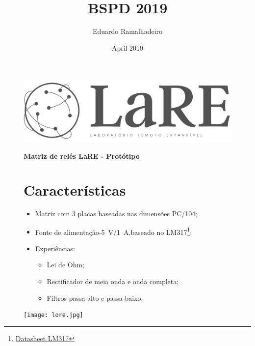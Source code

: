 \documentclass[a4paper,12pt,oneside,pdflatex,final,twocolumn]{article}
\title{BSPD 2019}
\author{Eduardo Ramalhadeiro}
\date{April 2019}
\begin{document}
\pagestyle{fancy}

\chead {\today}

\onecolumn

\begin{figure}
\begin{minipage}{0.47\textwidth}
\centering
\includegraphics[width=.7\textwidth,left,]{logo.jpg}

\end{minipage}
\hfill
\begin{minipage}{0.47\textwidth}
\raggedleft
\Huge \textbf{Matriz de relés LaRE - Protótipo}
\end{minipage}
\end{figure}


\begin{figure}
\begin{minipage}{0.47\textwidth}

\section{Características}
\begin{itemize}
    \item Matriz com 3 placas baseadas nas dimensões PC/104;
    \item Fonte de alimentação-\SI{5}{\volt}/\SI{1}{\ampere},\newline baseado no LM317\footnote{\href{https://www.ti.com/lit/ds/symlink/lm317.pdf}{Datasheet LM317}};
    \item Experiências:
    \begin{itemize}
        \item Lei de Ohm;
        \item Rectificador de meia onda e onda completa;
        \item Filtros passa-alto e passa-baixo.
    \end{itemize}
\end{itemize}


\end{minipage}
\hfill
\begin{minipage}{0.47\textwidth}
\centering
\texttt{[image: lore.jpg]}

\end{minipage}
\end{figure}
\end{document}
